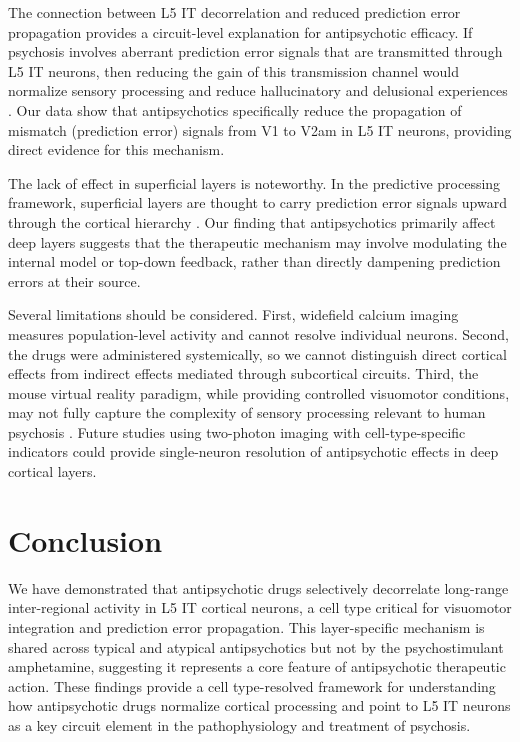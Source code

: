 \documentclass[11pt]{article}
\begin{document}
The connection between L5 IT decorrelation and reduced prediction error propagation provides a circuit-level explanation for antipsychotic efficacy. If psychosis involves aberrant prediction error signals that are transmitted through L5 IT neurons, then reducing the gain of this transmission channel would normalize sensory processing and reduce hallucinatory and delusional experiences \citep{corlett2019}. Our data show that antipsychotics specifically reduce the propagation of mismatch (prediction error) signals from V1 to V2am in L5 IT neurons, providing direct evidence for this mechanism.

The lack of effect in superficial layers is noteworthy. In the predictive processing framework, superficial layers are thought to carry prediction error signals upward through the cortical hierarchy \citep{bastos2012}. Our finding that antipsychotics primarily affect deep layers suggests that the therapeutic mechanism may involve modulating the internal model or top-down feedback, rather than directly dampening prediction errors at their source.

Several limitations should be considered. First, widefield calcium imaging measures population-level activity and cannot resolve individual neurons. Second, the drugs were administered systemically, so we cannot distinguish direct cortical effects from indirect effects mediated through subcortical circuits. Third, the mouse virtual reality paradigm, while providing controlled visuomotor conditions, may not fully capture the complexity of sensory processing relevant to human psychosis \citep{keller2012}. Future studies using two-photon imaging with cell-type-specific indicators could provide single-neuron resolution of antipsychotic effects in deep cortical layers.

\section{Conclusion}

We have demonstrated that antipsychotic drugs selectively decorrelate long-range inter-regional activity in L5 IT cortical neurons, a cell type critical for visuomotor integration and prediction error propagation. This layer-specific mechanism is shared across typical and atypical antipsychotics but not by the psychostimulant amphetamine, suggesting it represents a core feature of antipsychotic therapeutic action. These findings provide a cell type-resolved framework for understanding how antipsychotic drugs normalize cortical processing and point to L5 IT neurons as a key circuit element in the pathophysiology and treatment of psychosis.



\end{document}
